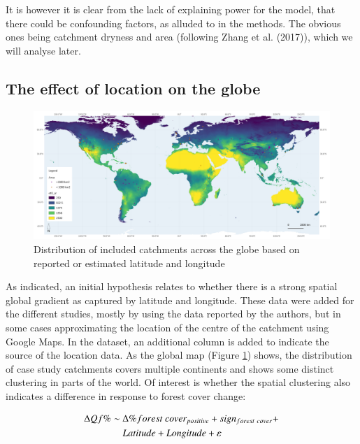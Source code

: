 \documentclass[]{elsarticle} %
\begin{document}
It is however it is clear from the lack of explaining power for the model, that there could be confounding factors, as alluded to in the methods. The obvious ones being catchment dryness and area (following Zhang et al. (2017)), which we will analyse later.

\hypertarget{the-effect-of-location-on-the-globe}{%
\subsection{The effect of location on the globe}\label{the-effect-of-location-on-the-globe}}

\begin{figure}
\includegraphics[width=0.9\linewidth]{../../data/FAOET0data2} \caption{Distribution of included catchments across the globe based on reported or estimated latitude and longitude}\label{fig:globalmap}
\end{figure}

As indicated, an initial hypothesis relates to whether there is a strong spatial global gradient as captured by latitude and longitude. These data were added for the different studies, mostly by using the data reported by the authors, but in some cases approximating the location of the centre of the catchment using Google Maps. In the dataset, an additional column is added to indicate the source of the location data. As the global map (Figure \ref{fig:globalmap}) shows, the distribution of case study catchments covers multiple continents and shows some distinct clustering in parts of the world. Of interest is whether the spatial clustering also indicates a difference in response to forest cover change:

\begin{align}
\Delta Qf \% \sim ~ & \Delta \% forest~cover_{positive} + sign_{forest~cover} + \notag \\ &  Latitude + Longitude + \varepsilon \label{eq:eq4}
\end{align}
\end{document}
